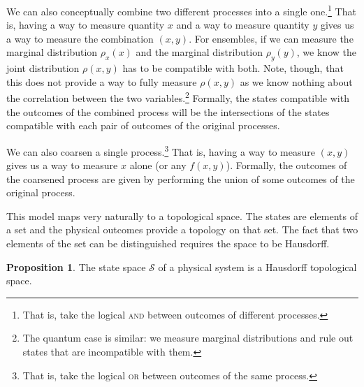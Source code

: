 \documentclass[smallextended]{svjour3}
\numberwithin{equation}{section}
\theoremstyle{definition}
\newtheorem{prop}[equation]{Proposition}
\begin{document}
We can also conceptually combine two different processes into a single one.\footnote{That is, take the logical \textsc{and} between outcomes of different processes.} That is, having a way to measure quantity $x$ and a way to measure quantity $y$ gives us a way to measure the combination $(x,y)$. For ensembles, if we can measure the marginal distribution $\rho_x(x)$ and the marginal distribution $\rho_y(y)$, we know the joint distribution $\rho(x,y)$ has to be compatible with both. Note, though, that this does not provide a way to fully measure $\rho(x,y)$ as we know nothing about the correlation between the two variables.\footnote{The quantum case is similar: we measure marginal distributions and rule out states that are incompatible with them.} Formally, the states compatible with the outcomes of the combined process will be the intersections of the states compatible with each pair of outcomes of the original processes.

We can also coarsen a single process.\footnote{That is, take the logical \textsc{or} between outcomes of the same process.} That is, having a way to measure $(x,y)$ gives us a way to measure $x$ alone (or any $f(x,y)$). Formally, the outcomes of the coarsened process are given by performing the union of some outcomes of the original process.

This model maps very naturally to a topological space. The states are elements of a set and the physical outcomes provide a topology on that set. The fact that two elements of the set can be distinguished requires the space to be Hausdorff.

\begin{prop}\label{prop:state_topology}
The state space $\mathcal{S}$ of a physical system is a Hausdorff topological space.
\end{prop}
\end{document}
